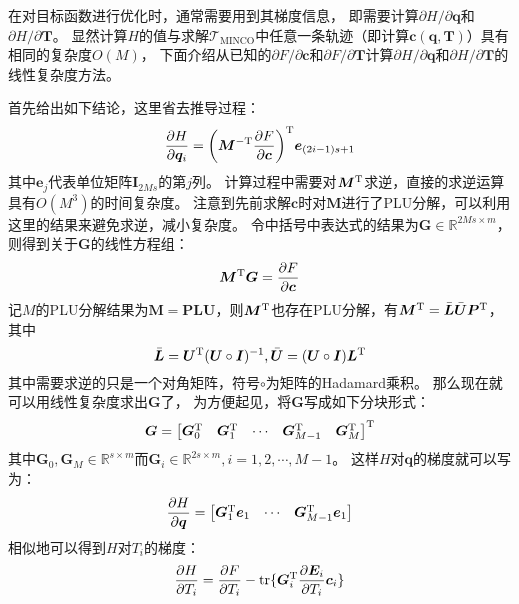 在对目标函数进行优化时，通常需要用到其梯度信息，
即需要计算${\partial H}/{\partial \bm{q}}$和${\partial H}/{\partial \bm{T}}$。
显然计算$H$的值与求解$\mathscr{T}_{\text{MINCO}}$中任意一条轨迹（即计算$\bm{c}(\bm{q}, \bm{T})$）具有相同的复杂度$O(M)$，
下面介绍从已知的${\partial F}/{\partial \bm{c}}$和${\partial F}/{\partial \bm{T}}$计算${\partial H}/{\partial \bm{q}}$和${\partial H}/{\partial \bm{T}}$的线性复杂度方法。

首先给出如下结论，这里省去推导过程：
\begin{equation}
  \frac{\partial{H}}{\partial{\bm{q}_i}} = {\left(\bm{M}^{-\text{T}}\frac{\partial{F}}{\partial{\bm{c}}}\right)}^{\text{T}} \bm{e}_{(2i-1)s+1}
  \label{equ:grad_H_qi}
\end{equation}
其中$\bm{e}_j$代表单位矩阵$\bm{I}_{2Ms}$的第$j$列。
计算过程中需要对${\bm{M}}^{\text{T}}$求逆，直接的求逆运算具有$O(M^3)$的时间复杂度。
注意到先前求解$\bm{c}$时对$\bm{M}$进行了PLU分解，可以利用这里的结果来避免求逆，减小复杂度。
令中括号中表达式的结果为$\bm{G}\in\mathbb{R}^{2Ms\times m}$，
则得到关于$\bm{G}$的线性方程组： 
\begin{equation}
  {\bm{M}}^{\text{T}}\bm{G} = \frac{\partial{F}}{\partial{\bm{c}}}
  \label{equ:linear_equation_system_wrt_G}
\end{equation}
记$M$的PLU分解结果为$\bm{M} = \bm{PLU}$，则${\bm{M}}^{\text{T}}$也存在PLU分解，有${\bm{M}}^{\text{T}}=\bar{\bm{L}}\bar{\bm{U}}{\bm{P}}^{\text{T}}$，其中 
\begin{equation}
  \bar{\bm{L}} = {\bm{U}}^{\text{T}}(\bm{U}\circ\bm{I})^{-1}, \bar{\bm{U}} = (\bm{U}\circ\bm{I}){\bm{L}}^{\text{T}}
  \label{equ:LU_of_trans_M}
\end{equation}
其中需要求逆的只是一个对角矩阵，符号$\circ$为矩阵的Hadamard乘积。
那么现在就可以用线性复杂度求出$\bm{G}$了，
为方便起见，将$\bm{G}$写成如下分块形式：
\begin{equation}
  \bm{G} = {
    \begin{bmatrix}
      \bm{G}_0^{\text{T}} & \bm{G}_1^{\text{T}} & \cdots & \bm{G}_{M-1}^{\text{T}} & \bm{G}_M^{\text{T}}
    \end{bmatrix}
  }^{\text{T}}
  \label{equ:block_form_of_G}
\end{equation}
其中$\bm{G}_0, \bm{G}_M \in \mathbb{R}^{s \times m}$而$\bm{G}_i \in \mathbb{R}^{2s \times m}, i = 1, 2, \cdots, M-1$。
这样$H$对$\bm{q}$的梯度就可以写为：
\begin{equation}
  \frac{\partial{H}}{\partial{\bm{q}}} = 
  \begin{bmatrix}
    \bm{G}_1^{\text{T}}\bm{e}_1 & \cdots & \bm{G}_{M-1}^{\text{T}}\bm{e}_1
  \end{bmatrix}
  \label{equ:grad_H_q}
\end{equation}
相似地可以得到$H$对$T_i$的梯度： 
\begin{equation}
  \frac{\partial{H}}{\partial{T_i}} = \frac{\partial{F}}{\partial{T_i}} - \text{tr}\{\bm{G}_i^{\text{T}}\frac{\partial{\bm{E}_i}}{\partial{T_i}}\bm{c}_i\}
  \label{equ:grad_H_Ti}
\end{equation}

